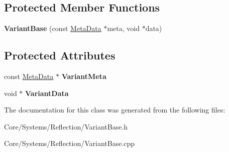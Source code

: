 \subsection*{Protected Member Functions}
\begin{DoxyCompactItemize}
\item 
\hypertarget{classDCEngine_1_1VariantBase_a62004f149b822a3216da51b4a162aa46}{{\bfseries Variant\-Base} (const \hyperlink{classDCEngine_1_1MetaData}{Meta\-Data} $\ast$meta, void $\ast$data)}\label{classDCEngine_1_1VariantBase_a62004f149b822a3216da51b4a162aa46}

\end{DoxyCompactItemize}
\subsection*{Protected Attributes}
\begin{DoxyCompactItemize}
\item 
\hypertarget{classDCEngine_1_1VariantBase_a950d7083ca73dda24462cb390ae61053}{const \hyperlink{classDCEngine_1_1MetaData}{Meta\-Data} $\ast$ {\bfseries Variant\-Meta}}\label{classDCEngine_1_1VariantBase_a950d7083ca73dda24462cb390ae61053}

\item 
\hypertarget{classDCEngine_1_1VariantBase_a03e5e012dc1d312828a84d19f1387ca6}{void $\ast$ {\bfseries Variant\-Data}}\label{classDCEngine_1_1VariantBase_a03e5e012dc1d312828a84d19f1387ca6}

\end{DoxyCompactItemize}


The documentation for this class was generated from the following files\-:\begin{DoxyCompactItemize}
\item 
Core/\-Systems/\-Reflection/Variant\-Base.\-h\item 
Core/\-Systems/\-Reflection/Variant\-Base.\-cpp\end{DoxyCompactItemize}
